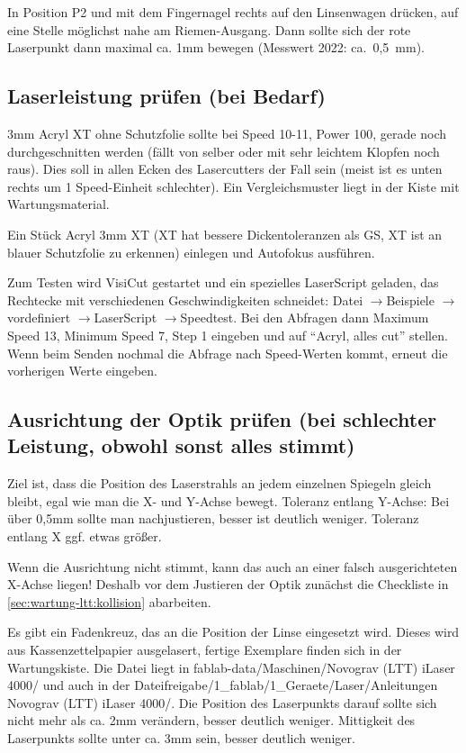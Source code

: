 \documentclass{\basedir/fablab-document}
\newcommand{\pfeil}{\ensuremath{\rightarrow}}
\begin{document}
	In Position P2 und mit dem Fingernagel rechts auf den Linsenwagen drücken, auf eine Stelle möglichst nahe am Riemen-Ausgang. Dann sollte sich der rote Laserpunkt dann maximal ca. 1mm bewegen (Messwert 2022: ca.\ 0,5\, mm).
	

\subsection{Laserleistung prüfen (bei Bedarf)}
3mm Acryl XT ohne Schutzfolie sollte bei Speed 10-11, Power 100, gerade noch durchgeschnitten werden (fällt von selber oder mit sehr leichtem Klopfen noch raus). Dies soll in allen Ecken des Lasercutters der Fall sein (meist ist es unten rechts um 1 Speed-Einheit schlechter). Ein Vergleichsmuster liegt in der Kiste mit Wartungsmaterial.

Ein Stück Acryl 3mm XT (XT hat bessere Dickentoleranzen als GS, XT ist an blauer Schutzfolie zu erkennen) einlegen und Autofokus ausführen.

Zum Testen wird VisiCut gestartet und ein spezielles LaserScript geladen, das Rechtecke mit verschiedenen Geschwindigkeiten schneidet: Datei \pfeil Beispiele \pfeil vordefiniert \pfeil LaserScript \pfeil Speedtest. Bei den Abfragen dann Maximum Speed 13, Minimum Speed 7, Step 1 eingeben und auf \enquote{Acryl, alles cut} stellen. Wenn beim Senden nochmal die Abfrage nach Speed-Werten kommt, erneut die vorherigen Werte eingeben.




\subsection{Ausrichtung der Optik prüfen (bei schlechter Leistung, obwohl sonst alles stimmt)}\label{ltt-wartung-optik}
Ziel ist, dass die Position des Laserstrahls an jedem einzelnen Spiegeln gleich bleibt, egal wie man die X- und Y-Achse bewegt. Toleranz entlang Y-Achse: Bei über 0,5mm sollte man nachjustieren, besser ist deutlich weniger. Toleranz entlang X ggf. etwas größer.

Wenn die Ausrichtung nicht stimmt, kann das auch an einer falsch ausgerichteten X-Achse liegen! Deshalb vor dem Justieren der Optik zunächst die Checkliste in \cref{sec:wartung-ltt:kollision} abarbeiten.

Es gibt ein Fadenkreuz, das an die Position der Linse eingesetzt wird. Dieses wird aus Kassenzettelpapier ausgelasert, fertige Exemplare finden sich in der Wartungskiste. Die Datei liegt in fablab-data/Maschinen/Novograv (LTT) iLaser 4000/ und auch in der Dateifreigabe/1_fablab/1_Geraete/Laser/Anleitungen Novograv  (LTT) iLaser 4000/. Die Position des Laserpunkts darauf sollte sich nicht mehr als ca. 2mm verändern, besser deutlich weniger. Mittigkeit des Laserpunkts sollte unter ca. 3mm sein, besser deutlich weniger.
\end{document}
